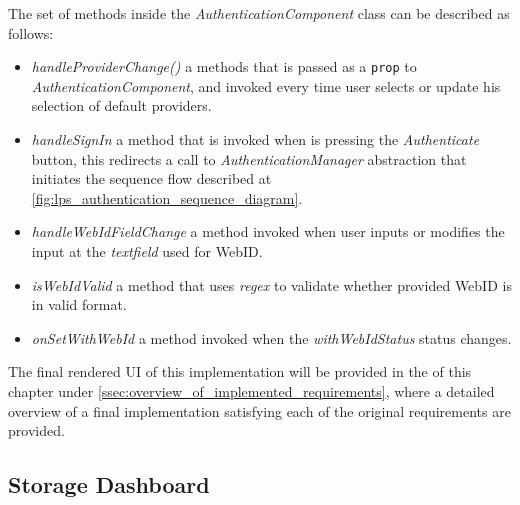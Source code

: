 The set of methods inside the \textit{AuthenticationComponent} class can be described as follows:
\begin{itemize}
	\item \textit{handleProviderChange()} a methods that is passed as a \texttt{prop} to \textit{AuthenticationComponent}, and invoked every time user selects or update his selection of default providers.
	\item \textit{handleSignIn} a method that is invoked when is pressing the \textit{Authenticate} button, this redirects a call to \textit{AuthenticationManager} abstraction that initiates the sequence flow described at \autoref{fig:lps_authentication_sequence_diagram}.
	\item \textit{handleWebIdFieldChange} a method invoked when user inputs or modifies the input at the \textit{textfield} used for WebID.
	\item \textit{isWebIdValid} a method that uses \textit{regex} to validate whether provided WebID is in valid format.
	\item \textit{onSetWithWebId} a method invoked when the \textit{withWebIdStatus} status changes.  
\end{itemize}

The final rendered UI of this implementation will be provided in the of this chapter under \autoref{ssec:overview_of_implemented_requirements}, where a detailed overview of a final implementation satisfying each of the original \lpa{} requirements are provided.

\subsection{Storage Dashboard}
\label{sssec:storage_dashboard_implementation}

